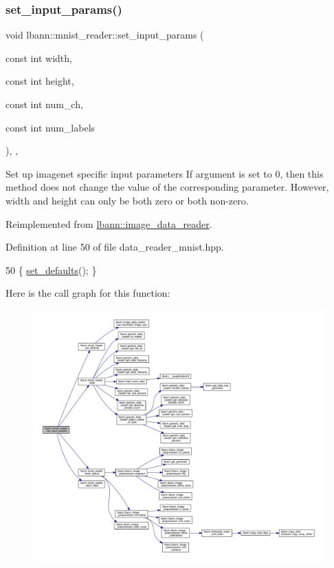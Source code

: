 \subsubsection{\texorpdfstring{set\+\_\+input\+\_\+params()}{set\_input\_params()}}
{\footnotesize\ttfamily void lbann\+::mnist\+\_\+reader\+::set\+\_\+input\+\_\+params (\begin{DoxyParamCaption}\item[{const int}]{width,  }\item[{const int}]{height,  }\item[{const int}]{num\+\_\+ch,  }\item[{const int}]{num\+\_\+labels }\end{DoxyParamCaption})\hspace{0.3cm}{\ttfamily [inline]}, {\ttfamily [override]}, {\ttfamily [virtual]}}

Set up imagenet specific input parameters If argument is set to 0, then this method does not change the value of the corresponding parameter. However, width and height can only be both zero or both non-\/zero. 

Reimplemented from \hyperlink{classlbann_1_1image__data__reader_a6ed9b8b12ad3ffa93ad458d872f8c044}{lbann\+::image\+\_\+data\+\_\+reader}.



Definition at line 50 of file data\+\_\+reader\+\_\+mnist.\+hpp.


\begin{DoxyCode}
50 \{ \hyperlink{classlbann_1_1mnist__reader_a5b9a3d56e2d1e1c6820b3c7cc8cde17d}{set\_defaults}(); \}
\end{DoxyCode}
Here is the call graph for this function\+:\nopagebreak
\begin{figure}[H]
\begin{center}
\leavevmode
\includegraphics[width=350pt]{classlbann_1_1mnist__reader_aa50ae6f2aeb5800de0e15e3ab9046338_cgraph}
\end{center}
\end{figure}


